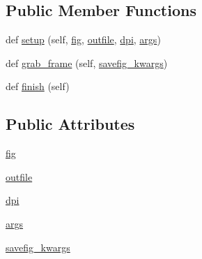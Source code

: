 \subsection*{Public Member Functions}
\begin{DoxyCompactItemize}
\item 
def \hyperlink{classmatplotlib_1_1tests_1_1test__animation_1_1NullMovieWriter_aa21f24324c0e8bf8ceeea1a1757d08f0}{setup} (self, \hyperlink{classmatplotlib_1_1tests_1_1test__animation_1_1NullMovieWriter_ad59c42e9da77674978fc8f424e90dd90}{fig}, \hyperlink{classmatplotlib_1_1tests_1_1test__animation_1_1NullMovieWriter_a54c33e258ff8c305170a78b4956b1612}{outfile}, \hyperlink{classmatplotlib_1_1tests_1_1test__animation_1_1NullMovieWriter_a3433bdee43deca607ce34a48e47e29e8}{dpi}, \hyperlink{classmatplotlib_1_1tests_1_1test__animation_1_1NullMovieWriter_afda41d5cd597bbc853a3a67a8f7b5840}{args})
\item 
def \hyperlink{classmatplotlib_1_1tests_1_1test__animation_1_1NullMovieWriter_abbb41e65d2a20ec535f517e4b5cd642d}{grab\+\_\+frame} (self, \hyperlink{classmatplotlib_1_1tests_1_1test__animation_1_1NullMovieWriter_aac8e7518460aaa00edeac663ad79ab21}{savefig\+\_\+kwargs})
\item 
def \hyperlink{classmatplotlib_1_1tests_1_1test__animation_1_1NullMovieWriter_ad355baec713b5f1bf70efca30edc95cb}{finish} (self)
\end{DoxyCompactItemize}
\subsection*{Public Attributes}
\begin{DoxyCompactItemize}
\item 
\hyperlink{classmatplotlib_1_1tests_1_1test__animation_1_1NullMovieWriter_ad59c42e9da77674978fc8f424e90dd90}{fig}
\item 
\hyperlink{classmatplotlib_1_1tests_1_1test__animation_1_1NullMovieWriter_a54c33e258ff8c305170a78b4956b1612}{outfile}
\item 
\hyperlink{classmatplotlib_1_1tests_1_1test__animation_1_1NullMovieWriter_a3433bdee43deca607ce34a48e47e29e8}{dpi}
\item 
\hyperlink{classmatplotlib_1_1tests_1_1test__animation_1_1NullMovieWriter_afda41d5cd597bbc853a3a67a8f7b5840}{args}
\item 
\hyperlink{classmatplotlib_1_1tests_1_1test__animation_1_1NullMovieWriter_aac8e7518460aaa00edeac663ad79ab21}{savefig\+\_\+kwargs}
\end{DoxyCompactItemize}


